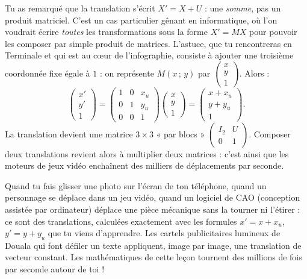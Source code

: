 \documentclass[11pt]{article}
\begin{document}
\begin{savaistu}
Tu as remarqué que la translation s'écrit $X' = X + U$ : une \emph{somme}, pas un produit matriciel. C'est un cas particulier gênant en informatique, où l'on voudrait écrire \emph{toutes} les transformations sous la forme $X' = MX$ pour pouvoir les composer par simple produit de matrices. L'astuce, que tu rencontreras en Terminale et qui est au cœur de l'infographie, consiste à ajouter une troisième coordonnée fixe égale à $1$ : on représente $M(x\,;\,y)$ par $\begin{pmatrix} x \\ y \\ 1 \end{pmatrix}$. Alors :
\[ \begin{pmatrix} x' \\ y' \\ 1 \end{pmatrix} = \begin{pmatrix} 1 & 0 & x_u \\ 0 & 1 & y_u \\ 0 & 0 & 1 \end{pmatrix} \begin{pmatrix} x \\ y \\ 1 \end{pmatrix} = \begin{pmatrix} x + x_u \\ y + y_u \\ 1 \end{pmatrix}. \]
La translation devient une matrice $3\times 3$ « par blocs » $\begin{pmatrix} I_2 & U \\ 0 & 1 \end{pmatrix}$. Composer deux translations revient alors à multiplier deux matrices : c'est ainsi que les moteurs de jeux vidéo enchaînent des milliers de déplacements par seconde.
\end{savaistu}

\begin{savaistu}
Quand tu fais glisser une photo sur l'écran de ton téléphone, quand un personnage se déplace dans un jeu vidéo, quand un logiciel de CAO (conception assistée par ordinateur) déplace une pièce mécanique sans la tourner ni l'étirer : ce sont des translations, calculées exactement avec les formules $x' = x + x_u$, $y' = y + y_u$ que tu viens d'apprendre. Les cartels publicitaires lumineux de Douala qui font défiler un texte appliquent, image par image, une translation de vecteur constant. Les mathématiques de cette leçon tournent des millions de fois par seconde autour de toi !
\end{savaistu}
\end{document}
